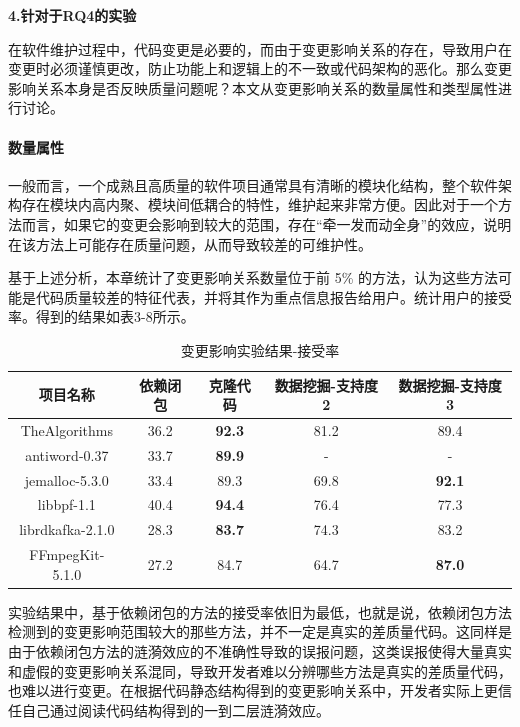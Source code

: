 \textbf{4.针对于RQ4的实验}

在软件维护过程中，代码变更是必要的，而由于变更影响关系的存在，导致用户在变更时必须谨慎更改，防止功能上和逻辑上的不一致或代码架构的恶化。那么变更影响关系本身是否反映质量问题呢？本文从变更影响关系的数量属性和类型属性进行讨论。

\paragraph{数量属性} 一般而言，一个成熟且高质量的软件项目通常具有清晰的模块化结构，整个软件架构存在模块内高内聚、模块间低耦合的特性，维护起来非常方便。因此对于一个方法而言，如果它的变更会影响到较大的范围，存在“牵一发而动全身”的效应，说明在该方法上可能存在质量问题，从而导致较差的可维护性。

基于上述分析，本章统计了变更影响关系数量位于前 5\% 的方法，认为这些方法可能是代码质量较差的特征代表，并将其作为重点信息报告给用户。统计用户的接受率。得到的结果如表3-8所示。

\begin{table}[htbp]
\caption{变更影响实验结果-接受率}
\vspace{0.5em}\centering\wuhao
\begin{tabular}{ccccc}
\toprule
项目名称 & 依赖闭包 & 克隆代码 & 数据挖掘-支持度2 & 数据挖掘-支持度3 \\
\midrule
TheAlgorithms & 36.2 & \textbf{92.3} & 81.2 & 89.4\\
antiword-0.37 & 33.7 & \textbf{89.9} & - & -\\
jemalloc-5.3.0 & 33.4 & 89.3 & 69.8 & \textbf{92.1}\\
libbpf-1.1 & 40.4 & \textbf{94.4} & 76.4 & 77.3\\
librdkafka-2.1.0 & 28.3 & \textbf{83.7} & 74.3 & 83.2\\
FFmpegKit-5.1.0 & 27.2 & 84.7 & 64.7 & \textbf{87.0}\\

\bottomrule
\end{tabular}
\end{table}

实验结果中，基于依赖闭包的方法的接受率依旧为最低，也就是说，依赖闭包方法检测到的变更影响范围较大的那些方法，并不一定是真实的差质量代码。这同样是由于依赖闭包方法的涟漪效应的不准确性导致的误报问题，这类误报使得大量真实和虚假的变更影响关系混同，导致开发者难以分辨哪些方法是真实的差质量代码，也难以进行变更。在根据代码静态结构得到的变更影响关系中，开发者实际上更信任自己通过阅读代码结构得到的一到二层涟漪效应。

